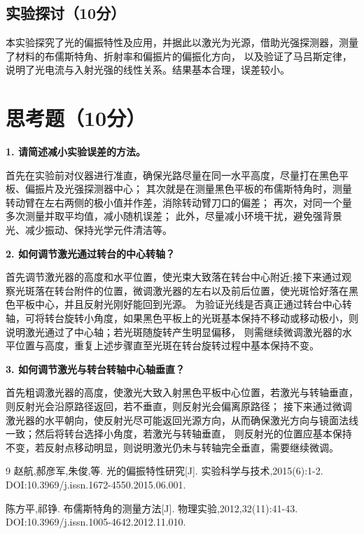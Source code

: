 \documentclass{Phyport}
\begin{document}
\subsection{实验探讨（10分）}

本实验探究了光的偏振特性及应用，并据此以激光为光源，借助光强探测器，测量了材料的布儒斯特角、折射率和偏振片的偏振化方向，
以及验证了马吕斯定律，说明了光电流与入射光强的线性关系。结果基本合理，误差较小。

\section{思考题（10分）}

\textbf{1. 请简述减小实验误差的方法。}

首先在实验前对仪器进行准直，确保光路尽量在同一水平高度，尽量打在黑色平板、偏振片及光强探测器中心；
其次就是在测量黑色平板的布儒斯特角时，测量转动臂在左右两侧的极小值并作差，消除转动臂刀口的偏差；
再次，对同一个量多次测量并取平均值，减小随机误差；
此外，尽量减小环境干扰，避免强背景光、减少振动、保持光学元件清洁等。


\textbf{2. 如何调节激光通过转台的中心转轴？}

首先调节激光器的高度和水平位置，使光束大致落在转台中心附近;接下来通过观察光斑落在转台附件的位置，微调激光器的左右以及前后位置，使光斑恰好落在黑色平板中心，并且反射光刚好能回到光源。
为验证光线是否真正通过转台中心转轴，可将转台旋转小角度，如果黑色平板上的光斑基本保持不移动或移动极小，则说明激光通过了中心轴；若光斑随旋转产生明显偏移，
则需继续微调激光器的水平位置与高度，重复上述步骤直至光斑在转台旋转过程中基本保持不变。

\textbf{3. 如何调节激光与转台转轴中心轴垂直？}

首先粗调激光器的高度，使激光大致入射黑色平板中心位置，若激光与转轴垂直，则反射光会沿原路径返回，若不垂直，则反射光会偏离原路径；
接下来通过微调激光器的水平朝向，使反射光尽可能返回光源方向，从而确保激光方向与镜面法线一致；然后将转台选择小角度，若激光与转轴垂直，
则反射光的位置应基本保持不变，若反射点移动明显，则说明激光仍未与转轴完全垂直，需要继续微调。

\begin{thebibliography}{9}
    赵航,郝彦军,朱俊,等. 光的偏振特性研究[J]. 实验科学与技术,2015(6):1-2. DOI:10.3969/j.issn.1672-4550.2015.06.001. 
    
    陈方平,祁铮. 布儒斯特角的测量方法[J]. 物理实验,2012,32(11):41-43. DOI:10.3969/j.issn.1005-4642.2012.11.010.    

\end{thebibliography}


\end{document}
